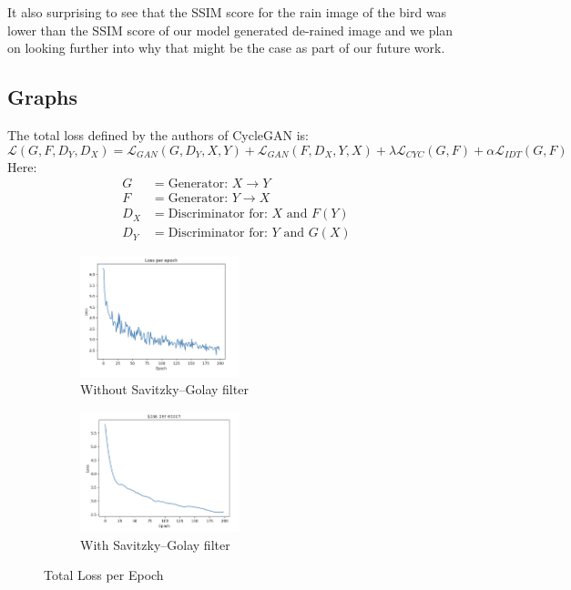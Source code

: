 \documentclass{article}
\begin{document}
It also surprising to see that the SSIM score for the rain image of the bird was lower than the SSIM score of our model generated de-rained image and we plan on looking further into why that might be the case as part of our future work. 

\subsection{Graphs}

The total loss defined by the authors of CycleGAN is:
$$
	\mathcal{L}(G, F, D_Y, D_X) = \mathcal{L}_{GAN}(G, D_Y, X, Y) + \mathcal{L}_{GAN}(F, D_X, Y, X) + \lambda \mathcal{L}_{CYC}(G, F) + \alpha \mathcal{L}_{IDT}(G, F)
$$
Here:
\begin{align*}
	G &= \text{Generator: } X \rightarrow Y \\
	F &= \text{Generator: }  Y \rightarrow X \\
	D_X &= \text{Discriminator for: } X \text{ and } F(Y) \\
	D_Y &= \text{Discriminator for: } Y \text{ and } G(X)
\end{align*}

\begin{figure}[H]
	\begin{subfigure}{0.5\textwidth}
		\centering
		\includegraphics[width=0.9\linewidth, height=35mm]{images/total_loss}
		\caption{Without Savitzky–Golay filter}
	\end{subfigure}
	\begin{subfigure}{.5\textwidth}
		\centering
		\includegraphics[width=.9\linewidth,height=35mm]{images/total_loss_smooth.png}
		\caption{With Savitzky–Golay filter}
	\end{subfigure}
	\caption{Total Loss per Epoch}
	\label{totalloss}
\end{figure}
\end{document}
